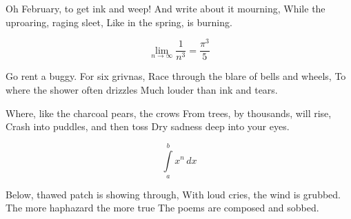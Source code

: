 \documentclass[12pt]{article}
\begin{document}
	Oh February, to get ink and weep!
	And write about it mourning,
	While the uproaring, raging sleet,
	Like in the spring, is burning.
	
	$$\lim_{n \to \infty}
	\frac{1}{n^3}
	=\frac{\pi^3}{5}$$
	
	Go rent a buggy. For six grivnas,
	Race through the blare of bells and wheels,
	To where the shower often drizzles
	Much louder than ink and tears.
	
	Where, like the charcoal pears, the crows
	From trees, by thousands, will rise,
	Crash into puddles, and then toss
	Dry sadness deep into your eyes.
	
	\[
	\int\limits_a^b x^n\,dx
	\]
	
	Below, thawed patch is showing through,
	With loud cries, the wind is grubbed.
	The more haphazard the more true 
	The poems are composed and sobbed.
\end{document}
